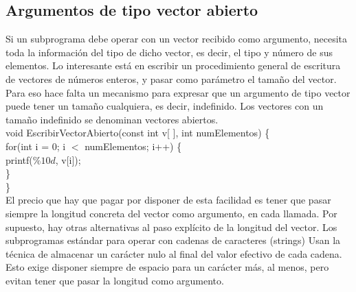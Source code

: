 \documentclass[11pt,a4paper]{article}
\begin{document}
  \subsection{Argumentos de tipo vector abierto}
  Si un subprograma debe operar con un vector recibido como argumento, necesita toda la información del tipo de dicho vector, es decir, el tipo y número de sus elementos. Lo interesante está en escribir un procedimiento general de escritura de
  vectores de números enteros, y pasar como parámetro el tamaño del vector.
  Para eso hace falta un mecanismo para expresar que un argumento de tipo vector puede tener un tamaño cualquiera, es decir, indefinido. Los vectores con un tamaño indefinido se denominan vectores abiertos. \\
  void EscribirVectorAbierto(const int v[ ], int numElementos) \{\\
  for(int i = 0; i $<$ numElementos; i++) \{\\
  printf($\%10d$, v[i]);\\
  \}\\
  \}\\
  El precio que hay que pagar por disponer de esta facilidad es tener que pasar
  siempre la longitud concreta del vector como argumento, en cada llamada.
  Por supuesto, hay otras alternativas al paso explícito de la longitud del vector.
  Los subprogramas estándar para operar con cadenas de caracteres (strings)
  Usan la técnica de almacenar un carácter nulo al final del valor efectivo de cada cadena. Esto exige disponer siempre de espacio para un carácter más, al menos, pero evitan tener que pasar la longitud como argumento.
\end{document}
